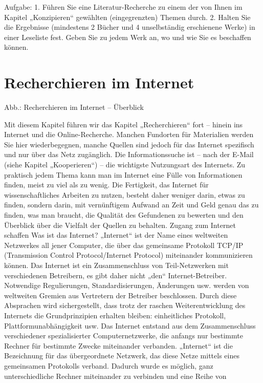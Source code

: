 \documentclass[]{book}
\theoremstyle{definition}
\theoremstyle{definition}
\theoremstyle{definition}
\theoremstyle{remark}
\begin{document}
Aufgabe: 1. Führen Sie eine Literatur-Recherche zu einem der von Ihnen
im Kapitel „Konzipieren`` gewählten (eingegrenzten) Themen durch. 2.
Halten Sie die Ergebnisse (mindestens 2 Bücher und 4 unselbständig
erschienene Werke) in einer Leseliste fest. Geben Sie zu jedem Werk an,
wo und wie Sie es beschaffen können.

\chapter{Recherchieren im Internet}\label{recherchieren-im-internet}

Abb.: Recherchieren im Internet -- Überblick

Mit diesem Kapitel führen wir das Kapitel „Recherchieren`` fort --
hinein ins Internet und die Online-Recherche. Manchen Fundorten für
Materialien werden Sie hier wiederbegegnen, manche Quellen sind jedoch
für das Internet spezifisch und nur über das Netz zugänglich. Die
Informationssuche ist -- nach der E-Mail (siehe Kapitel „Kooperieren``)
-- die wichtigste Nutzungsart des Internets. Zu praktisch jedem Thema
kann man im Internet eine Fülle von Informationen finden, meist zu viel
als zu wenig. Die Fertigkeit, das Internet für wissenschaftliches
Arbeiten zu nutzen, besteht daher weniger darin, etwas zu finden,
sondern darin, mit vernünftigem Aufwand an Zeit und Geld genau das zu
finden, was man braucht, die Qualität des Gefundenen zu bewerten und den
Überblick über die Vielfalt der Quellen zu behalten. Zugang zum Internet
schaffen Was ist das Internet? „Internet`` ist der Name eines weltweiten
Netzwerkes all jener Computer, die über das gemeinsame Protokoll TCP/IP
(Transmission Control Protocol/Internet Protocol) miteinander
kommunizieren können. Das Internet ist ein Zusammenschluss von
Teil-Netzwerken mit verschiedenen Betreibern, es gibt daher nicht „den``
Internet-Betreiber. Notwendige Regulierungen, Standardisierungen,
Änderungen usw. werden von weltweiten Gremien aus Vertretern der
Betreiber beschlossen. Durch diese Absprachen wird sichergestellt, dass
trotz der raschen Weiterentwicklung des Internets die Grundprinzipien
erhalten bleiben: einheitliches Protokoll, Plattformunabhängigkeit usw.
Das Internet entstand aus dem Zusammenschluss verschiedener
spezialisierter Computernetzwerke, die anfangs nur bestimmte Rechner für
bestimmte Zwecke miteinander verbanden. „Internet`` ist die Bezeichnung
für das übergeordnete Netzwerk, das diese Netze mittels eines
gemeinsamen Protokolls verband. Dadurch wurde es möglich, ganz
unterschiedliche Rechner miteinander zu verbinden und eine Reihe von
\end{document}
